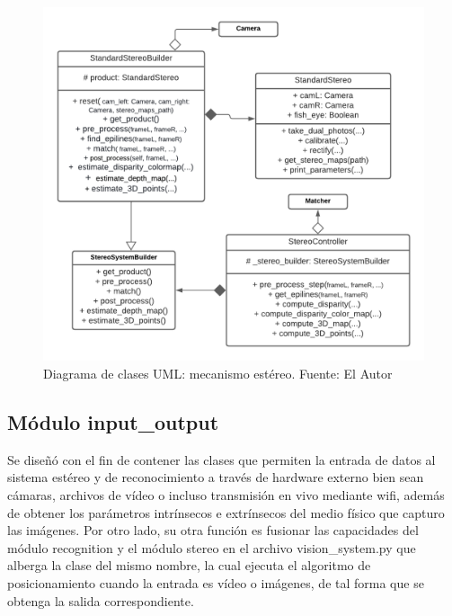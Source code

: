 \begin{figure}[H]
    \centering
    \includegraphics[scale=0.5]{Recursos/builder_uml.png}
    \caption[Diagrama de clases UML: mecanismo estéreo.]{Diagrama de clases UML: mecanismo estéreo. {\footnotesize Fuente: El Autor}}
    \label{builder_stereo_uml}
\end{figure}
\subsection{Módulo input\_output}
Se diseñó con el fin de contener las clases que permiten la entrada de datos al sistema estéreo y de reconocimiento a través de hardware externo bien sean cámaras, archivos de vídeo o incluso transmisión en vivo mediante wifi, además de obtener los parámetros intrínsecos e extrínsecos del medio físico que capturo las imágenes. Por otro lado, su otra función es fusionar las capacidades del módulo recognition y el módulo stereo en el archivo vision\_system.py que alberga la clase del mismo nombre, la cual ejecuta el algoritmo de posicionamiento cuando la entrada es vídeo o imágenes, de tal forma que se obtenga la salida correspondiente.